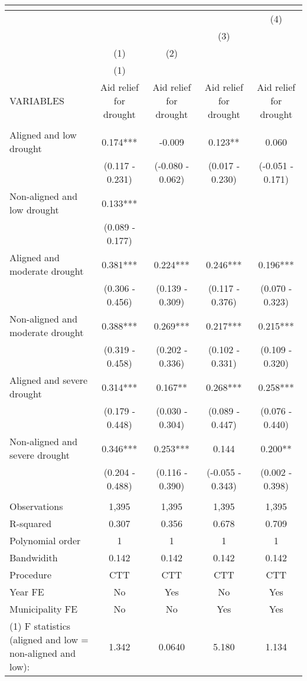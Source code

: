 \begin{tabular}{lcccc}
\multicolumn{5}{c}{} \\ \hline
 &  &  &  & (4) \\
 &  &  & (3) &  \\
 & (1) & (2) &  &  \\
 & (1) &  &  &  \\
VARIABLES & Aid relief for drought & Aid relief for drought & Aid relief for drought & Aid relief for drought \\ \hline
 &  &  &  &  \\
Aligned and low drought & 0.174*** & -0.009 & 0.123** & 0.060 \\
 & (0.117 - 0.231) & (-0.080 - 0.062) & (0.017 - 0.230) & (-0.051 - 0.171) \\
Non-aligned and low drought & 0.133*** &  &  &  \\
 & (0.089 - 0.177) &  &  &  \\
Aligned and moderate drought & 0.381*** & 0.224*** & 0.246*** & 0.196*** \\
 & (0.306 - 0.456) & (0.139 - 0.309) & (0.117 - 0.376) & (0.070 - 0.323) \\
Non-aligned and moderate drought & 0.388*** & 0.269*** & 0.217*** & 0.215*** \\
 & (0.319 - 0.458) & (0.202 - 0.336) & (0.102 - 0.331) & (0.109 - 0.320) \\
Aligned and severe drought & 0.314*** & 0.167** & 0.268*** & 0.258*** \\
 & (0.179 - 0.448) & (0.030 - 0.304) & (0.089 - 0.447) & (0.076 - 0.440) \\
Non-aligned and severe drought & 0.346*** & 0.253*** & 0.144 & 0.200** \\
 & (0.204 - 0.488) & (0.116 - 0.390) & (-0.055 - 0.343) & (0.002 - 0.398) \\
 &  &  &  &  \\
Observations & 1,395 & 1,395 & 1,395 & 1,395 \\
R-squared & 0.307 & 0.356 & 0.678 & 0.709 \\
Polynomial order & 1 & 1 & 1 & 1 \\
Bandwidith & 0.142 & 0.142 & 0.142 & 0.142 \\
Procedure & CTT & CTT & CTT & CTT \\
Year FE & No & Yes & No & Yes \\
Municipality FE & No & No & Yes & Yes \\
(1) F statistics (aligned and low = non-aligned and low): & 1.342 & 0.0640 & 5.180 & 1.134 \\

\end{tabular}
